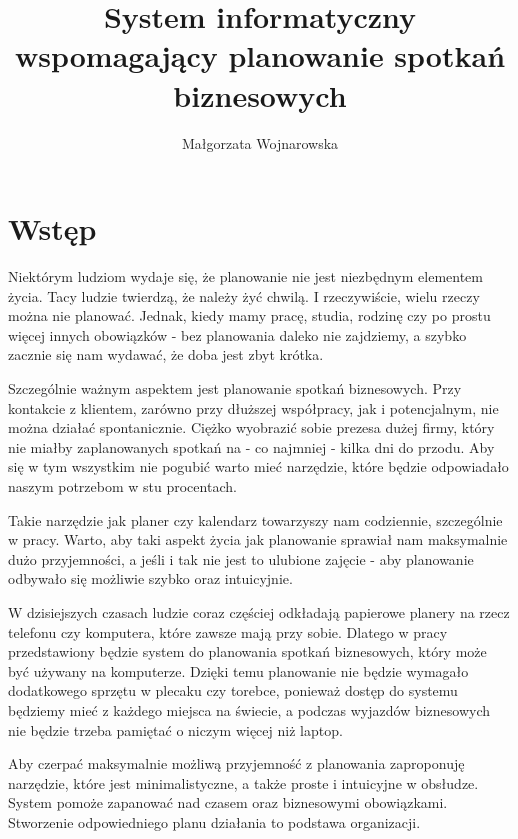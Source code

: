 \documentclass[eng,printmode,openany,oneside]{mgr}
\title{System informatyczny wspomagający planowanie spotkań biznesowych}
\author{Małgorzata Wojnarowska}
\begin{document}

\maketitle %

\tableofcontents %

\chapter{Wstęp}
Niektórym ludziom wydaje się, że planowanie nie jest niezbędnym elementem życia. Tacy ludzie twierdzą, że należy żyć chwilą. I rzeczywiście, wielu rzeczy można nie planować. Jednak, kiedy mamy pracę, studia, rodzinę czy po prostu więcej innych obowiązków - bez planowania daleko nie zajdziemy, a szybko zacznie się nam wydawać, że doba jest zbyt krótka.

Szczególnie ważnym aspektem jest planowanie spotkań biznesowych. Przy kontakcie z klientem, zarówno przy dłuższej współpracy, jak i potencjalnym, nie można działać spontanicznie. Ciężko wyobrazić sobie prezesa dużej firmy, który nie miałby zaplanowanych spotkań na - co najmniej - kilka dni do przodu. Aby się w tym wszystkim nie pogubić warto mieć narzędzie, które będzie odpowiadało naszym potrzebom w stu procentach. 


Takie narzędzie jak planer czy kalendarz towarzyszy nam codziennie, szczególnie w pracy. Warto, aby taki aspekt życia jak planowanie sprawiał nam maksymalnie dużo przyjemności, a jeśli i tak nie jest to ulubione zajęcie - aby planowanie odbywało się możliwie szybko oraz intuicyjnie.


W dzisiejszych czasach ludzie coraz częściej odkładają papierowe planery na rzecz telefonu czy komputera, które zawsze mają przy sobie. Dlatego w pracy przedstawiony będzie system do planowania spotkań biznesowych, który może być używany na komputerze. Dzięki temu planowanie nie będzie wymagało dodatkowego sprzętu w plecaku czy torebce, ponieważ dostęp do systemu będziemy mieć z każdego miejsca na świecie, a podczas wyjazdów biznesowych nie będzie trzeba pamiętać o niczym więcej niż laptop.


Aby czerpać maksymalnie możliwą przyjemność z planowania zaproponuję narzędzie, które jest minimalistyczne, a także proste i intuicyjne w obsłudze. System pomoże zapanować nad czasem oraz biznesowymi obowiązkami. Stworzenie odpowiedniego planu działania to podstawa organizacji.
\end{document}
